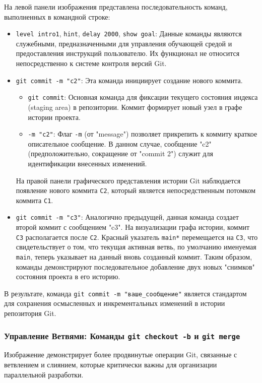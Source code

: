 На левой панели изображения представлена последовательность команд, выполненных в командной строке:
\begin{itemize}
    \item \texttt{level intro1}, \texttt{hint}, \texttt{delay 2000}, \texttt{show goal}: Данные команды являются служебными, предназначенными для управления обучающей средой и предоставления инструкций пользователю.
    Их функционал не относится непосредственно к системе контроля версий Git.
    \item \texttt{git commit -m "c2"}: Эта команда инициирует создание нового коммита.
    \begin{itemize}
        \item \texttt{git commit}: Основная команда для фиксации текущего состояния индекса (staging area) в репозитории.
        Коммит формирует новый узел в графе истории проекта.
        \item \texttt{-m "c2"}: Флаг \texttt{-m} (от "message") позволяет прикрепить к коммиту краткое описательное сообщение.
        В данном случае, сообщение "c2" (предположительно, сокращение от "commit 2") служит для идентификации внесенных изменений.
    \end{itemize}
    На правой панели графического представления истории Git наблюдается появление нового коммита \texttt{C2}, который является непосредственным потомком коммита \texttt{C1}.
    \item \texttt{git commit -m "c3"}: Аналогично предыдущей, данная команда создает второй коммит с сообщением "c3".
    На визуализации графа истории, коммит \texttt{C3} располагается после \texttt{C2}.
    Красный указатель \texttt{main*} перемещается на \texttt{C3}, что свидетельствует о том, что текущая активная ветвь, по умолчанию именуемая \texttt{main}, теперь указывает на данный вновь созданный коммит.
    Таким образом, команды демонстрируют последовательное добавление двух новых "снимков" состояния проекта в его историю.
\end{itemize}
В результате, команда \texttt{git commit -m "ваше\_сообщение"} является стандартом для сохранения осмысленных и инкрементальных изменений в истории репозитория Git.

\subsubsection{Управление Ветвями: Команды \texttt{git checkout -b} и \texttt{git merge}}\label{subsubsec:git-branch}
Изображение  демонстрирует более продвинутые операции Git, связанные с ветвлением и слиянием, которые критически важны для организации параллельной разработки.

